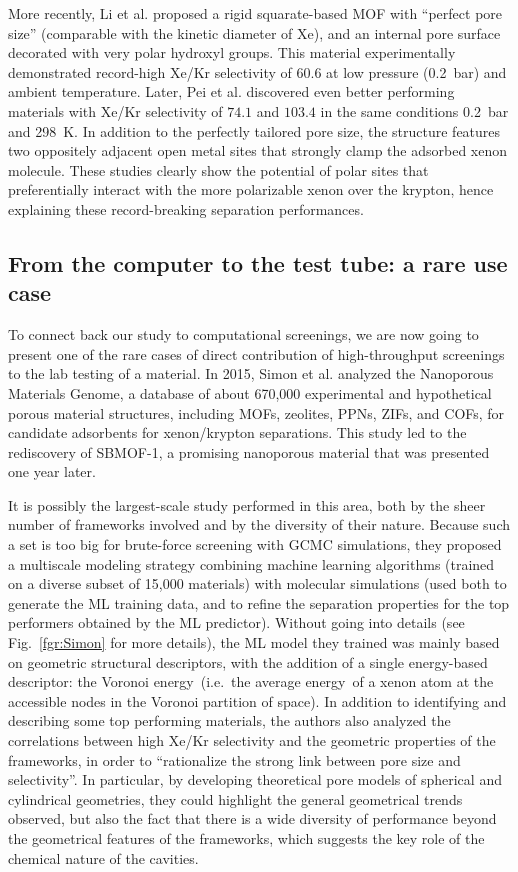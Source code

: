 \documentclass[main.tex]{subfiles}
\begin{document}
More recently, Li et al. proposed a rigid squarate-based MOF with ``perfect pore size'' (comparable with the kinetic diameter of Xe), and an internal pore surface decorated with very polar hydroxyl groups. This material experimentally demonstrated record-high Xe/Kr selectivity of $60.6$ at low pressure (\SI{0.2}{\bar}) and ambient temperature.\cite{Li_2019} Later, Pei et al. discovered even better performing materials with Xe/Kr selectivity of $74.1$ and $103.4$ in the same conditions \SI{0.2}{\bar} and \SI{298}{\kelvin}. In addition to the perfectly tailored pore size, the structure features two oppositely adjacent open metal sites that strongly clamp the adsorbed xenon molecule.\cite{Pei_2022} These studies clearly show the potential of polar sites that preferentially interact with the more polarizable xenon over the krypton, hence explaining these record-breaking separation performances. 

\subsection{From the computer to the test tube: a rare use case}

To connect back our study to computational screenings, we are now going to present one of the rare cases of direct contribution of high-throughput screenings to the lab testing of a material. In 2015, Simon et al.\cite{Simon_2015} analyzed the Nanoporous Materials Genome,\cite{Simon_2015_EES, Boyd_2017} a database of about 670,000 experimental and hypothetical porous material structures, including MOFs, zeolites, PPNs, ZIFs, and COFs, for candidate adsorbents for xenon/krypton separations. This study led to the rediscovery of SBMOF-1, a promising nanoporous material that was presented one year later.\cite{Banerjee_2016}

It is possibly the largest-scale study performed in this area, both by the sheer number of frameworks involved and by the diversity of their nature. Because such a set is too big for brute-force screening with GCMC simulations, they proposed a multiscale modeling strategy combining machine learning algorithms (trained on a diverse subset of 15,000 materials) with molecular simulations (used both to generate the ML training data, and to refine the separation properties for the top performers obtained by the ML predictor). Without going into details (see Fig.~\ref{fgr:Simon} for more details), the ML model they trained was mainly based on geometric structural descriptors, with the addition of a single energy-based descriptor: the Voronoi energy\ (i.e.\ the average energy\ of a xenon atom at the accessible nodes in the Voronoi partition of space). In addition to identifying and describing some top performing materials, the authors also analyzed the correlations between high Xe/Kr selectivity and the geometric properties of the frameworks, in order to ``rationalize the strong link between pore size and selectivity''. In particular, by developing theoretical pore models of spherical and cylindrical geometries, they could highlight the general geometrical trends observed, but also the fact that there is a wide diversity of performance beyond the geometrical features of the frameworks, which suggests the key role of the chemical nature of the cavities.
\end{document}
